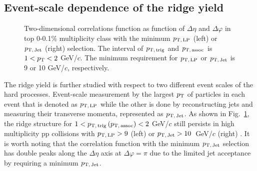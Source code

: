 \subsection{Event-scale dependence of the ridge yield}
\begin{figure}[h!]
	\centering
	\caption{ Two-dimensional correlations function as function of $\Delta\eta$ and $\Delta\varphi$ in top 0-0.1\% multiplicity class with the minimum $p_\mathrm{T,\,LP}$ (left) or $p_\mathrm{T,\,Jet}$ (right) selection. The interval of $p_\mathrm{T,\,trig}$ and $p_\mathrm{T,\,assoc}$ is $1<p_\mathrm{T}<2$ GeV/$c$. The minimum requirement for $p_\mathrm{T,\,LP}$ or $p_\mathrm{T,\,Jet}$ is 9 or 10 GeV/$c$, respectively. }
	\label{fig:PlotCorrHMTSel}
\end{figure}

The ridge yield is further studied with respect to two different event scales of the hard processes. Event-scale measurement by the largest $p_\mathrm{T}$ of particles in each event that is denoted as $p_\mathrm{T,\,LP}$ while the other is done by reconstructing jets and measuring their transverse momenta, represented as $p_\mathrm{T,\,Jet}$. As shown in Fig.~\ref{fig:PlotCorrHMTSel}, the ridge structure for $1< p_\mathrm{T,\,trig}\,(p_\mathrm{T,\,assoc}) <2$ GeV/$c$ still persists in high multiplicity pp collisions with $p_\mathrm{T,\,LP}>9$ (left) or $p_\mathrm{T,\,Jet}>10$~GeV/$c$ (right) .  %
It is worth noting that the correlation function with the minimum $p_\mathrm{T,\,Jet}$ selection has double peaks along the $\Delta\eta$ axis at $\Delta\varphi = \pi$ due to the limited jet acceptance by requiring a minimum $p_\mathrm{T,\,Jet}$.

